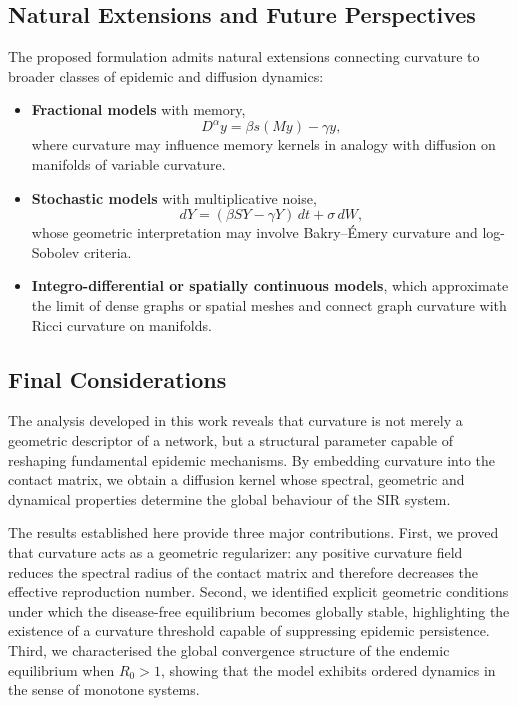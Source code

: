 \documentclass[final,3p,times,twocolumn]{elsarticle}
\begin{document}
\subsection{Natural Extensions and Future Perspectives}

The proposed formulation admits natural extensions connecting curvature to
broader classes of epidemic and diffusion dynamics:

\begin{itemize}[label=--]
    \item[(i)] \textbf{Fractional models} with memory,
    \[
        D^\alpha y = \beta s(My) - \gamma y,
    \]
    where curvature may influence memory kernels in analogy with diffusion on
    manifolds of variable curvature.

    \item[(ii)] \textbf{Stochastic models} with multiplicative noise,
    \[
        dY = (\beta SY - \gamma Y)\,dt + \sigma\, dW,
    \]
    whose geometric interpretation may involve Bakry--Émery curvature and 
    log-Sobolev criteria.

    \item[(iii)] \textbf{Integro-differential or spatially continuous models},
    which approximate the limit of dense graphs or spatial meshes and connect
    graph curvature with Ricci curvature on manifolds.
\end{itemize}

\subsection{Final Considerations}

The analysis developed in this work reveals that curvature is not merely a
geometric descriptor of a network, but a structural parameter capable of
reshaping fundamental epidemic mechanisms. By embedding curvature into the
contact matrix, we obtain a diffusion kernel whose spectral, geometric and
dynamical properties determine the global behaviour of the SIR system.

The results established here provide three major contributions.  
First, we proved that curvature acts as a geometric regularizer: any positive
curvature field reduces the spectral radius of the contact matrix and therefore
decreases the effective reproduction number.  
Second, we identified explicit geometric conditions under which the disease-free
equilibrium becomes globally stable, highlighting the existence of a curvature
threshold capable of suppressing epidemic persistence.  
Third, we characterised the global convergence structure of the endemic
equilibrium when $R_0>1$, showing that the model exhibits ordered dynamics in
the sense of monotone systems.
\end{document}
